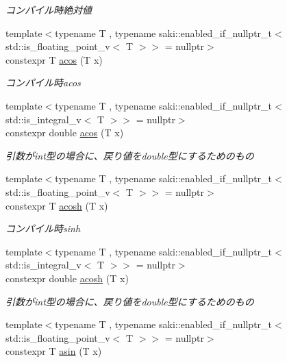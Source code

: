 \begin{DoxyCompactItemize}
\begin{DoxyCompactList}\small\item\em コンパイル時絶対値 \end{DoxyCompactList}\item 
{\footnotesize template$<$typename T , typename saki\+::enabled\+\_\+if\+\_\+nullptr\+\_\+t$<$ std\+::is\+\_\+floating\+\_\+point\+\_\+v$<$ T $>$$>$  = nullptr$>$ }\\constexpr T \mbox{\hyperlink{namespacesaki_a3189b75c5c7ecbf6d2204142da5fa813}{acos}} (T x)
\begin{DoxyCompactList}\small\item\em コンパイル時acos \end{DoxyCompactList}\item 
{\footnotesize template$<$typename T , typename saki\+::enabled\+\_\+if\+\_\+nullptr\+\_\+t$<$ std\+::is\+\_\+integral\+\_\+v$<$ T $>$$>$  = nullptr$>$ }\\constexpr double \mbox{\hyperlink{namespacesaki_a2cad65bf92f361b4b564268af96a7844}{acos}} (T x)
\begin{DoxyCompactList}\small\item\em 引数がint型の場合に、戻り値をdouble型にするためのもの \end{DoxyCompactList}\item 
{\footnotesize template$<$typename T , typename saki\+::enabled\+\_\+if\+\_\+nullptr\+\_\+t$<$ std\+::is\+\_\+floating\+\_\+point\+\_\+v$<$ T $>$$>$  = nullptr$>$ }\\constexpr T \mbox{\hyperlink{namespacesaki_ac1c85a4defc25dc9eb6b380f29946f83}{acosh}} (T x)
\begin{DoxyCompactList}\small\item\em コンパイル時sinh \end{DoxyCompactList}\item 
{\footnotesize template$<$typename T , typename saki\+::enabled\+\_\+if\+\_\+nullptr\+\_\+t$<$ std\+::is\+\_\+integral\+\_\+v$<$ T $>$$>$  = nullptr$>$ }\\constexpr double \mbox{\hyperlink{namespacesaki_a8d3766d425082661e966b04504b90002}{acosh}} (T x)
\begin{DoxyCompactList}\small\item\em 引数がint型の場合に、戻り値をdouble型にするためのもの \end{DoxyCompactList}\item 
{\footnotesize template$<$typename T , typename saki\+::enabled\+\_\+if\+\_\+nullptr\+\_\+t$<$ std\+::is\+\_\+floating\+\_\+point\+\_\+v$<$ T $>$$>$  = nullptr$>$ }\\constexpr T \mbox{\hyperlink{namespacesaki_a63f2b40515cd62b037dade64aa8465db}{asin}} (T x)

\end{DoxyCompactItemize}

